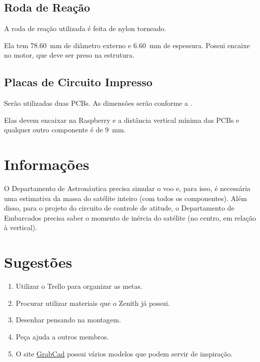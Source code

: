 \documentclass[brazilian, 12pt, oneside, a4paper]{article}
\begin{document}
\subsection*{Roda de Reação}
A roda de reação utilizada é feita de nylon torneado.


Ela tem \SI{78.60}{mm} de diâmetro externo e \SI{6.60}{mm} de espessura. Possui encaixe no motor, que deve ser preso na estrutura.

\subsection*{Placas de Circuito Impresso}
Serão utilizadas duas PCBs. As dimensões serão conforme a .

Elas devem encaixar na Raspberry e a distância vertical mínima das PCBs e qualquer outro componente é de \SI{9}{mm}.


\section*{Informações}

O Departamento de Astronáutica precisa simular o voo e, para isso, é necessária uma estimativa da massa do satélite inteiro (com todos os componentes). Além disso, para o projeto do circuito de controle de atitude, o Departamento de Embarcados precisa saber o momento de inércia do satélite (no centro, em relação à vertical).

\section*{Sugestões}

\begin{enumerate}
    \item Utilizar o Trello para organizar as metas.
    \item Procurar utilizar materiais que o Zenith já possui.
    \item Desenhar pensando na montagem.
    \item Peça ajuda a outros membros.
    \item O site \href{https://grabcad.com/challenges/the-cubesat-challenge/entries}{GrabCad} possui vários modelos que podem servir de inspiração.
\end{enumerate}
\end{document}
